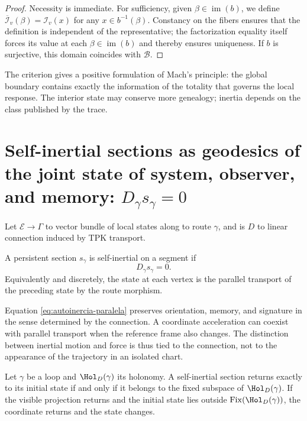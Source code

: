 \begin{proof}
Necessity is immediate. For sufficiency, given \(\beta\in\operatorname{im}(b)\), we define \(\overline{\mathcal I}_v(\beta)=\mathcal I_v(x)\) for any \(x\in b^{-1}(\beta)\). Constancy on the fibers ensures that the definition is independent of the representative; the factorization equality itself forces its value at each \(\beta\in\operatorname{im}(b)\) and thereby ensures uniqueness. If \(b\) is surjective, this domain coincides with \(\mathcal B\).
\end{proof}

The criterion gives a positive formulation of Mach's principle: the global
boundary contains exactly the information of the totality that governs the
local response. The interior state may conserve more genealogy;
inertia depends on the class published by the trace.

\section{Self-inertial sections as geodesics of the joint state of system, observer, and memory: \(D_\gamma s_\gamma=0\)}

Let \(\mathcal E\to\Gamma\) to vector bundle of local states along
to route \(\gamma\), and is \(D\) to linear connection induced by
TPK transport.

\begin{definition}
A persistent section \(s_\gamma\) is self-inertial on a segment if
\begin{equation}
 D_\gamma s_\gamma=0.
 \label{eq:autoinercia-paralela}
\end{equation}
Equivalently and discretely, the state at each vertex is the parallel
transport of the preceding state by the route morphism.
\end{definition}

Equation \eqref{eq:autoinercia-paralela} preserves orientation, memory, and
signature in the sense determined by the connection. A coordinate acceleration
can coexist with parallel transport when the reference frame also
changes. The distinction between inertial motion and force is thus tied to
the connection, not to the appearance of the trajectory in an isolated chart.

\begin{proposition}
\label{prop:autoinercia-holonomia}
Let \(\gamma\) be a loop and \(\Hol_D(\gamma)\) its holonomy. A
self-inertial section returns exactly to its initial state if and only if it belongs to the
fixed subspace of \(\Hol_D(\gamma)\). If the visible projection returns and the
initial state lies outside
\(\operatorname{Fix}(\Hol_D(\gamma))\), the coordinate returns and the
state changes.
\end{proposition}

